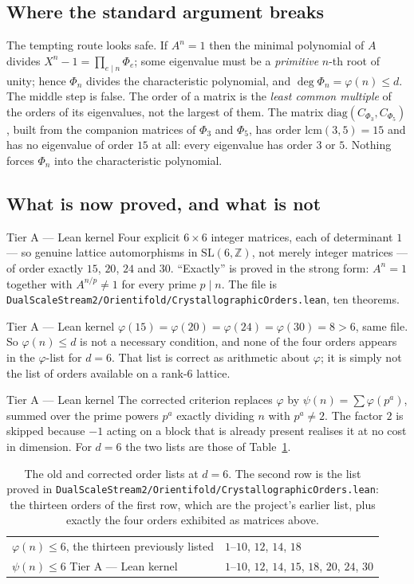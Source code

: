 \documentclass[11pt,a4paper]{article}
\theoremstyle{remark}
\newcommand{\tierA}{\colorbox{green!15}{\textsf{\scriptsize Tier A --- Lean kernel}}}
\newcommand{\lean}[1]{\texttt{#1}}
\begin{document}
\subsection*{Where the standard argument breaks}

The tempting route looks safe. If $A^n = 1$ then the minimal
polynomial of $A$ divides $X^n - 1 = \prod_{e \mid n} \Phi_e$; some eigenvalue must
be a \emph{primitive} $n$-th root of unity; hence $\Phi_n$ divides the characteristic
polynomial, and $\deg \Phi_n = \varphi(n) \le d$. The middle step is false. The order
of a matrix is the \emph{least common multiple} of the orders of its eigenvalues, not
the largest of them. The matrix $\mathrm{diag}(C_{\Phi_3}, C_{\Phi_5})$, built from the companion
matrices of $\Phi_3$ and $\Phi_5$, has order
$\mathrm{lcm}(3,5) = 15$ and has no eigenvalue of order $15$ at all: every eigenvalue
has order $3$ or $5$. Nothing forces $\Phi_n$ into the characteristic polynomial.

\subsection*{What is now proved, and what is not}

\tierA{} Four explicit $6 \times 6$ integer matrices, each of determinant $1$ --- so
genuine lattice automorphisms in $\mathrm{SL}(6,\mathbb{Z})$, not merely integer
matrices --- of order exactly $15$, $20$, $24$ and $30$. ``Exactly'' is proved in the
strong form: $A^n = 1$ together with $A^{n/p} \ne 1$ for every prime $p \mid n$. The
file is \lean{DualScaleStream2/Orientifold/CrystallographicOrders.lean}, ten
theorems.

\tierA{} $\varphi(15) = \varphi(20) = \varphi(24) = \varphi(30) = 8 > 6$, same file.
So $\varphi(n) \le d$ is not a necessary condition, and none of the four orders
appears in the $\varphi$-list for $d = 6$. That list is correct as arithmetic about
$\varphi$; it is simply not the list of orders available on a rank-$6$ lattice.

\tierA{} The corrected criterion replaces $\varphi$ by
$\psi(n) = \sum \varphi(p^a)$, summed over the prime powers $p^a$ exactly dividing
$n$ with $p^a \ne 2$. The factor $2$ is skipped because $-1$ acting on a block that
is already present realises it at no cost in dimension. For $d = 6$ the two lists
are those of Table~\ref{tab:orders}.

\begin{table}[h]
\centering
\begin{tabular}{ll}
\hline
$\varphi(n) \le 6$, the thirteen previously listed & $1$--$10$, $12$, $14$, $18$ \\
$\psi(n) \le 6$ \tierA{} & $1$--$10$, $12$, $14$, $15$, $18$, $20$, $24$, $30$ \\
\hline
\end{tabular}
\caption{The old and corrected order lists at $d = 6$. The second row is the list
proved in \lean{DualScaleStream2/Orientifold/CrystallographicOrders.lean}: the
thirteen orders of the first row, which are the project's earlier list, plus exactly
the four orders exhibited as matrices above.}
\label{tab:orders}
\end{table}
\end{document}
